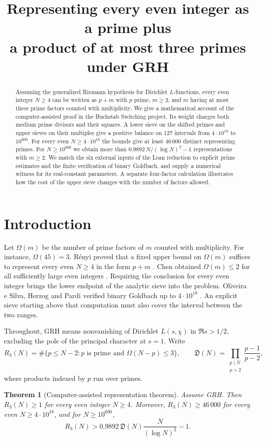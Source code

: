 \documentclass[11pt]{article}
\title{Representing every even integer as a prime plus\texorpdfstring{\\}{ }a product of at most three primes under GRH}
\author{}
\date{}
\newtheorem{theorem}{Theorem}
\theoremstyle{remark}\newtheorem{remark}[theorem]{Remark}
\begin{document}
\maketitle
\vspace{-2.3em}
\begin{abstract}
Assuming the generalized Riemann hypothesis for Dirichlet $L$-functions, every even integer $N\ge4$ can be written as $p+m$ with $p$ prime, $m\ge2$, and $m$ having at most three prime factors counted with multiplicity. We give a mathematical account of the computer-assisted proof in the Buchstab Switching project. Its weight charges both medium prime divisors and their squares. A lower sieve on the shifted primes and upper sieves on their multiples give a positive balance on 127 intervals from $4\cdot10^{18}$ to $10^{600}$. For every even $N\ge4\cdot10^{18}$ the bounds give at least $46\,000$ distinct representing primes. For $N\ge10^{600}$ we obtain more than $0.9892\,N/(\log N)^2-1$ representations with $m\ge2$. We match the six external inputs of the Lean reduction to explicit prime estimates and the finite verification of binary Goldbach, and supply a numerical witness for its real-constant parameters. A separate four-factor calculation illustrates how the cost of the upper sieve changes with the number of factors allowed.
\end{abstract}

\section{Introduction}
Let $\Omega(m)$ be the number of prime factors of $m$ counted with multiplicity. For instance, $\Omega(45)=3$. Rényi proved that a fixed upper bound on $\Omega(m)$ suffices to represent every even $N\ge4$ in the form $p+m$ \cite{Renyi}. Chen obtained $\Omega(m)\le2$ for all sufficiently large even integers \cite{Chen}. Requiring the conclusion for every even integer brings the lower endpoint of the analytic sieve into the problem. Oliveira e Silva, Herzog and Pardi verified binary Goldbach up to $4\cdot10^{18}$ \cite{OHP}. An explicit sieve starting above that computation must also cover the interval between the two ranges.

Throughout, GRH means nonvanishing of Dirichlet $L(s,\chi)$ in $\Re s>1/2$, excluding the pole of the principal character at $s=1$. Write
\[
 R_3(N)=\#\{p\le N-2 : p\text{ is prime and }\Omega(N-p)\le3\},
 \qquad \mathfrak D(N)=\prod_{\substack{p\mid N\\p>2}}\frac{p-1}{p-2},
\]
where products indexed by $p$ run over primes.
\begin{theorem}[Computer-assisted representation theorem]\label{thm:main}
Assume GRH. Then $R_3(N)\ge1$ for every even integer $N\ge4$. Moreover, $R_3(N)\ge46\,000$ for every even $N\ge4\cdot10^{18}$, and for $N\ge10^{600}$,
\[
 R_3(N)>0.9892\,\mathfrak D(N)\frac{N}{(\log N)^2}-1 .
\]
\end{theorem}
\end{document}
